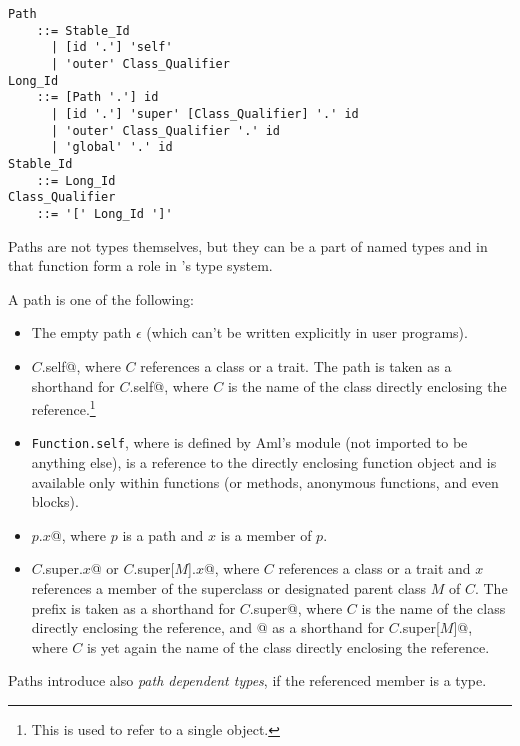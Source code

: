 \grammar\begin{lstlisting}
Path 
    ::= Stable_Id
      | [id '.'] 'self'
      | 'outer' Class_Qualifier
Long_Id 
    ::= [Path '.'] id
      | [id '.'] 'super' [Class_Qualifier] '.' id
      | 'outer' Class_Qualifier '.' id
      | 'global' '.' id
Stable_Id
    ::= Long_Id
Class_Qualifier 
    ::= '[' Long_Id ']'
\end{lstlisting}

Paths are not types themselves, but they can be a part of named types and in that function form a role in \Aml's type system. 

A path is one of the following:

\begin{itemize}
  \item The empty path $\epsilon$ (which can't be written explicitly in user programs). 

  \item \lstinline@$C$.self@, where $C$ references a class or a trait. The path  is taken as a shorthand for \lstinline@$C$.self@, where $C$ is the name of the class directly enclosing the reference.\footnote{This is used to refer to a single object. }
  
  \item \lstinline!Function.self!, where  is defined by Aml's  module (not imported to be anything else), is a reference to the directly enclosing function object and is available only within functions (or methods, anonymous functions, and even blocks).

  \item \lstinline@$p$.$x$@, where $p$ is a path and $x$ is a member of $p$.

  \item \lstinline@$C$.super.$x$@ or \lstinline@$C$.super[$M$].$x$@, where $C$ references a class or a trait and $x$ references a member of the superclass or designated parent class $M$ of $C$. The prefix  is taken as a shorthand for \lstinline@$C$.super@, where $C$ is the name of the class directly enclosing the reference, and \lstinline@super[$M$]@ as a shorthand for \lstinline@$C$.super[$M$]@, where $C$ is yet again the name of the class directly enclosing the reference. 
\end{itemize}

Paths introduce also {\em path dependent types}, if the referenced member is a type. 





